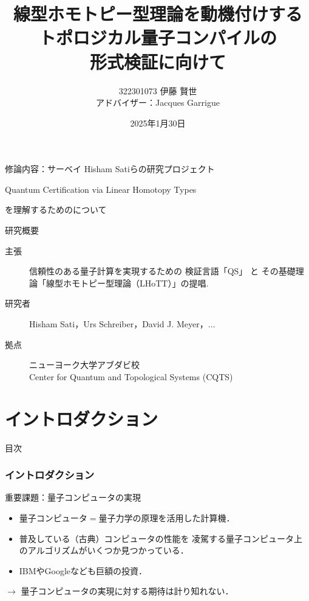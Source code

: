 \documentclass{beamer} %
\title[トポロジカル量子コンパイル]{線型ホモトピー型理論を動機付けする\\
トポロジカル量子コンパイルの\\
形式検証に向けて}
\author[322301073 伊藤 賢世]{322301073 伊藤 賢世\\
アドバイザー：Jacques Garrigue}
\date{2025年1月30日}
\newcommand{\0}{\mathbf{0}}
\newcommand{\1}{\mathbf{1}}
\newcommand{\2}{\mathbf{2}}
\begin{document}
\begin{frame}
  \maketitle
\end{frame}

\begin{frame}
  \begin{block}{修論内容：サーベイ}
    Hisham Satiらの研究プロジェクト
    \begin{center}
      Quantum Certification
      via Linear Homotopy Types
    \end{center}
    を理解するためのについて
  \end{block}
  \begin{block}{研究概要}
    \begin{description}
      \item[主張] 信頼性のある量子計算を実現するための
        検証言語「QS」 と
        その基礎理論「線型ホモトピー型理論（LHoTT）」の提唱.
      \item[研究者] Hisham Sati，Urs Schreiber，David J. Meyer，\(\ldots\)
      \item[拠点] ニューヨーク大学アブダビ校\\
        Center for Quantum and
        Topological Systems (CQTS)
    \end{description}
  \end{block}
\end{frame}

\section{イントロダクション}
\begin{frame}[noframenumbering]{目次}
  \tableofcontents[currentsection]
\end{frame}

\begin{frame}
  \frametitle{イントロダクション}
  \begin{block}{重要課題：量子コンピュータの実現}
    \begin{itemize}
      \item 量子コンピュータ\(=\)量子力学の原理を活用した計算機．
      \item 普及している（古典）コンピュータの性能を
            凌駕する量子コンピュータ上のアルゴリズムがいくつか見つかっている．
      \item IBMやGoogleなども巨額の投資．
    \end{itemize}
    \begin{center}
      \(\longrightarrow\)
      量子コンピュータの実現に対する期待は計り知れない．
    \end{center}
  \end{block}
\end{frame}
\end{document}

